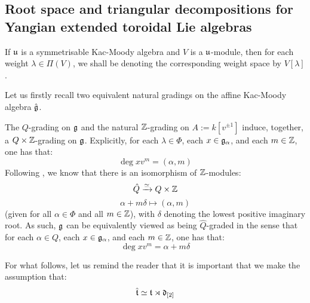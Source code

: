     \subsection{Root space and triangular decompositions for Yangian extended toroidal Lie algebras}
        \begin{convention}
            If $\mathfrak{u}$ is a symmetrisable Kac-Moody algebra and $V$ is a $\mathfrak{u}$-module, then for each weight $\lambda \in \Pi(V)$, we shall be denoting the corresponding weight space by $V[\lambda]$.
        \end{convention}
    
        Let us firstly recall two equivalent natural gradings on the affine Kac-Moody algebra $\hat{\mathfrak{g}}$. 
        \begin{remark}
            The $Q$-grading on $\mathfrak{g}$ and the natural $\mathbb{Z}$-grading on $A := k[v^{\pm 1}]$ induce, together, a $Q \x \Z$-grading on $\mathfrak{g}$. Explicitly, for each $\lambda \in \Phi$, each $x \in \mathfrak{g}_{\alpha}$, and each $m \in \mathbb{Z}$, one has that:
                $$\deg x v^m = (\alpha, m)$$
            Following \cite[Chapter 6]{kac_infinite_dimensional_lie_algebras}, we know that there is an isomorphism of $\mathbb{Z}$-modules:
                $$\hat{Q} \xrightarrow[]{\cong} Q \x \Z$$
                $$\alpha + m\delta \mapsto (\alpha, m)$$
            (given for all $\alpha \in \Phi$ and all $m \in \mathbb{Z}$), with $\delta$ denoting the lowest positive imaginary root. As such, $\mathfrak{g}$ can be equivalently viewed as being $\hat{Q}$-graded in the sense that for each $\alpha \in Q$, each $x \in \mathfrak{g}_{\alpha}$, and each $m \in \mathbb{Z}$, one has that:
                $$\deg x v^m = \alpha + m\delta$$
        \end{remark}
        For what follows, let us remind the reader that it is important that we make the assumption that:
            $$\hat{\mathfrak{t}} \simeq \mathfrak{t} \rtimes \mathfrak{d}_{[2]}$$

